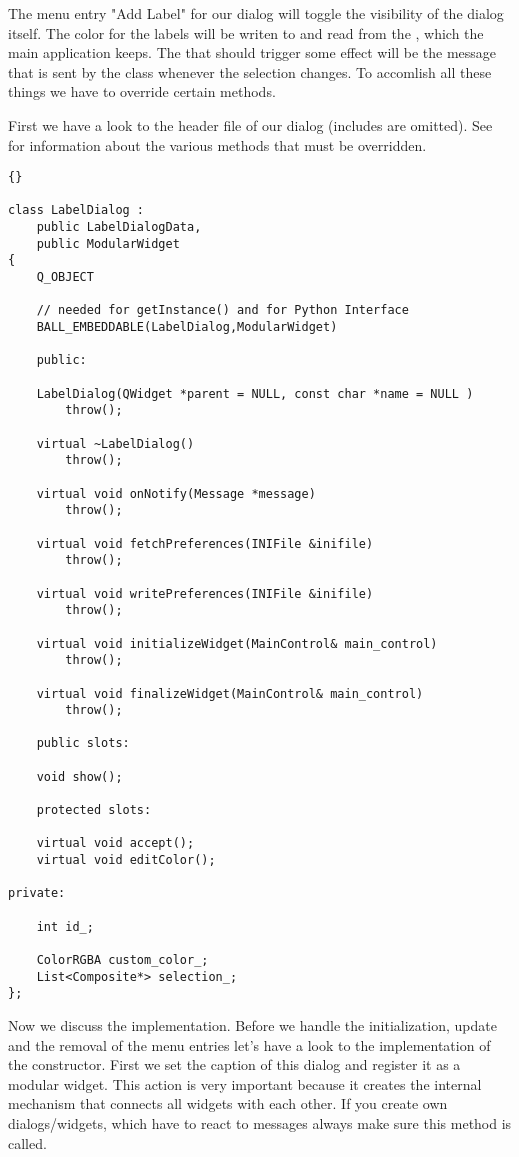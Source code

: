 The menu entry "Add Label" for our dialog will toggle the visibility of the dialog itself.
The color for the labels will be writen to
and read from the , which the main application keeps. The
 that should trigger some effect will be the message 
 that is sent by the class  
whenever the selection changes. To accomlish all these things we have to 
override certain methods.

First we have a look to the header file of our dialog (includes are omitted).
See  for information about the various methods that must
be overridden.

\begin{lstlisting}{}

class LabelDialog : 
	public LabelDialogData,
	public ModularWidget
{
	Q_OBJECT
	
	// needed for getInstance() and for Python Interface
	BALL_EMBEDDABLE(LabelDialog,ModularWidget)
		
	public:
	
	LabelDialog(QWidget *parent = NULL, const char *name = NULL )
		throw();

	virtual ~LabelDialog()
		throw();
					
	virtual void onNotify(Message *message)
		throw();
					
	virtual void fetchPreferences(INIFile &inifile)
		throw();
	
	virtual void writePreferences(INIFile &inifile)
		throw();
		
	virtual void initializeWidget(MainControl& main_control)
		throw();
	
	virtual void finalizeWidget(MainControl& main_control)
		throw();
				
	public slots:

	void show();

	protected slots:
					
	virtual void accept();
	virtual void editColor();

private:
	
	int id_;
	
	ColorRGBA custom_color_;
	List<Composite*> selection_;
};
\end{lstlisting}

Now we discuss the implementation. Before we handle the initialization,
update and the removal of the menu entries let's have a look to the
implementation of the constructor. First we set the caption of this dialog
and register it as a modular widget. This action is very important because it
creates the internal mechanism that connects all widgets with each other. If
you create own dialogs/widgets, which have to react to messages always make 
sure this method is called.

